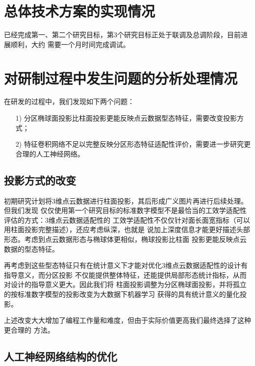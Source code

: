 \documentclass[a4paper,12pt]{ctexbook}	%
\begin{document}
\section{总体技术方案的实现情况}

已经完成第一、第二个研究目标，第3个研究目标正处于联调及总调阶段，目前进展顺利，大约
需要一个月时间完成调试。


\section{对研制过程中发生问题的分析处理情况}

在研发的过程中，我们发现如下两个问题：

\begin{itemize}
\setlength{\parskip}{0pt}
\item[1)]
分区椭球面投影比柱面投影更能反映点云数据型态特征，需要改变投影方式；

\item[2)]
特征卷积网络不足以完整反映分区形态特征适配性评价，需要进一步研究更合理的人工神经网络。

\end{itemize}


\subsection{投影方式的改变}

初期研究计划将3维点云数据进行柱面投影，其后形成广义图片再进行后续处理。但我们发现
仅仅使用第一个研究目标的标准数字模型不是最恰当的工效学适配性评估的方式：3维点云数据适配性的
工效学适配性不仅仅针对面长面宽指标（可以用柱面投影完整描述），还应考虑纵深，也就是
说加上深度信息才能更好描述头部形态。考虑到点云数据形态与椭球体更相似，椭球投影比柱面
投影更能反映点云数据的型态特征。

再考虑到这些型态特征只有在统计意义下才能对优化3维点云数据适配性的设计有指导意义，而分区投影
不仅能提供整体特征，还能提供局部形态统计指标，从而对设计的指导意义更大。因此我们将
柱面投影调整为分区椭球面投影，并将孤立的按标准数字模型的投影改变为大数据下机器学习
获得的具有统计意义的量化投影。

上述改变大大增加了编程工作量和难度，但由于实际价值更高我们最终选择了这种更合理的
方法。

\subsection{人工神经网络结构的优化}
\end{document}
